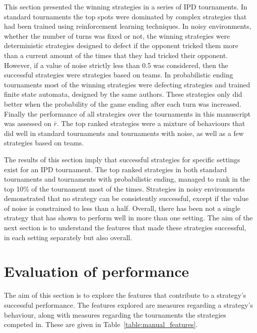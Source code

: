 \documentclass{article}
\newcommand{\numberofalltournaments}{}
\newcommand{\numberofstrategies}{}
\begin{document}
This section presented the winning strategies in a series of IPD tournaments. In
standard tournaments the top spots were dominated by complex strategies that had
been trained using reinforcement learning techniques. In noisy environments,
whether the number of turns was fixed or not, the winning strategies were
deterministic strategies designed to defect if the opponent tricked them more
than a current amount of the times that they had tricked their opponent. However,
if a value of noise strictly less than 0.5 was considered, then the successful
strategies were strategies based on teams. In
probabilistic ending tournaments most of the winning strategies were defecting
strategies and trained finite state automata, designed by the same authors.
These strategies only did better when the probability of the game ending after
each turn was increased.
Finally the performance of all \numberofstrategies
strategies over the \numberofalltournaments tournaments in this manuscript was
assessed on \(\bar{r}\). The top ranked strategies were a mixture of behaviours
that did well in standard tournaments and tournaments with noise, as well as a
few strategies based on teams.

The results of this section imply that successful strategies for specific
settings exist for an IPD tournament. The top ranked strategies in both standard
tournaments and tournaments with probabilistic ending, managed to rank in the
top 10\% of the tournament most of the times.
Strategies in noisy
environments demonstrated that no strategy can be consistently
successful, except if the value of noise is constrained to less than a half.
Overall, there has been not a single strategy that has shown to perform well in
more than one setting. The aim of the next section is to understand the features
that made these strategies successful, in each setting separately
but also overall.

\section{Evaluation of performance}\label{section:evaluation_of_performance}

The aim of this section is to explore the features that contribute to a
strategy's successful performance. The features explored are measures regarding a
strategy's behaviour, along with measures regarding the tournaments the
strategies competed in. These are given in Table~\ref{table:manual_features}.
\end{document}
